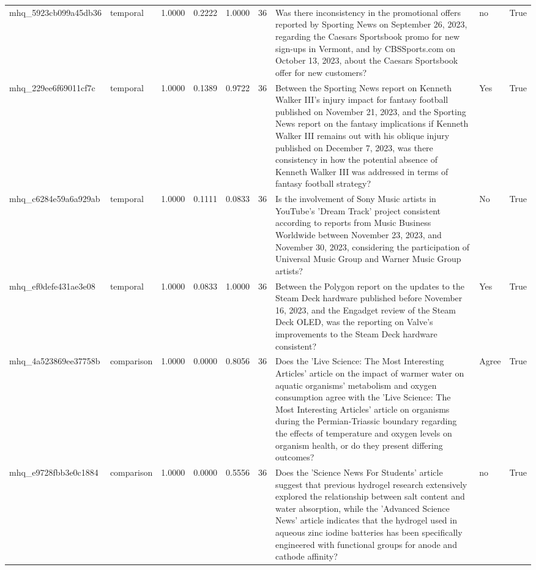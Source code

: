 \begin{tabular}{llrrrrllr}
mhq_5923cb099a45db36 & temporal & 1.0000 & 0.2222 & 1.0000 & 36 & Was there inconsistency in the promotional offers reported by Sporting News on September 26, 2023, regarding the Caesars Sportsbook promo for new sign-ups in Vermont, and by CBSSports.com on October 13, 2023, about the Caesars Sportsbook offer for new customers? & no & True \\
mhq_229ee6f69011cf7c & temporal & 1.0000 & 0.1389 & 0.9722 & 36 & Between the Sporting News report on Kenneth Walker III's injury impact for fantasy football published on November 21, 2023, and the Sporting News report on the fantasy implications if Kenneth Walker III remains out with his oblique injury published on December 7, 2023, was there consistency in how the potential absence of Kenneth Walker III was addressed in terms of fantasy football strategy? & Yes & True \\
mhq_c6284e59a6a929ab & temporal & 1.0000 & 0.1111 & 0.0833 & 36 & Is the involvement of Sony Music artists in YouTube's 'Dream Track' project consistent according to reports from Music Business Worldwide between November 23, 2023, and November 30, 2023, considering the participation of Universal Music Group and Warner Music Group artists? & No & True \\
mhq_ef0defe431ae3e08 & temporal & 1.0000 & 0.0833 & 1.0000 & 36 & Between the Polygon report on the updates to the Steam Deck hardware published before November 16, 2023, and the Engadget review of the Steam Deck OLED, was the reporting on Valve's improvements to the Steam Deck hardware consistent? & Yes & True \\
mhq_4a523869ee37758b & comparison & 1.0000 & 0.0000 & 0.8056 & 36 & Does the 'Live Science: The Most Interesting Articles' article on the impact of warmer water on aquatic organisms' metabolism and oxygen consumption agree with the 'Live Science: The Most Interesting Articles' article on organisms during the Permian-Triassic boundary regarding the effects of temperature and oxygen levels on organism health, or do they present differing outcomes? & Agree & True \\
mhq_e9728fbb3e0c1884 & comparison & 1.0000 & 0.0000 & 0.5556 & 36 & Does the 'Science News For Students' article suggest that previous hydrogel research extensively explored the relationship between salt content and water absorption, while the 'Advanced Science News' article indicates that the hydrogel used in aqueous zinc iodine batteries has been specifically engineered with functional groups for anode and cathode affinity? & no & True \\

\end{tabular}
